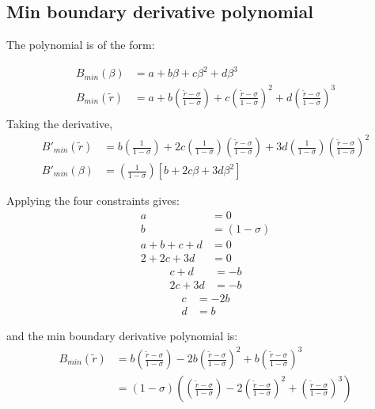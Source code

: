 \documentclass[a4paper]{article}
\begin{document}




\subsection{Min boundary derivative polynomial}



The polynomial is of the form: 

\begin{align*}
    B_{min} \left( \beta \right) &= 
    a + b \beta + c \beta^2 + d \beta^3                   \\
    B_{min} \left( \widetilde{r} \right) &= 
    a + b \left( \frac{\widetilde{r} - \sigma}{1 - \sigma} \right)+
    c\left( \frac{\widetilde{r} - \sigma}{1 - \sigma} \right)  ^2+
    d\left( \frac{\widetilde{r} - \sigma}{1 - \sigma} \right)^3                    \\
\end{align*}
Taking the derivative,
\begin{align*}
    B'_{min} \left( \widetilde{r} \right) &= 
    b \left( \frac{1}{1 - \sigma} \right)+
    2 c\left( \frac{1}{1 - \sigma} \right)\left( \frac{\widetilde{r} - \sigma}{1 - \sigma} \right)  +
    3 d\left( \frac{1}{1-\sigma} \right)\left( \frac{\widetilde{r} - \sigma}{1 - \sigma} \right)^2\\
    B'_{min} \left( \beta \right) &= 
    \left( \frac{1}{1 - \sigma} \right)
    \left[
    b +
    2 c \beta + 
    3 d \beta^2
    \right]
\end{align*}


Applying the four constraints gives:
\begin{align*}
    a &= 0\\
    b &= \left( 1 - \sigma \right) \\
    a + b + c + d &= 0\\
    2 + 2c + 3d &= 0
\end{align*}
\begin{align*}
    c + d &= -b  \\
    2c + 3d &= -b
\end{align*}
\begin{align*}
    c &= -2b \\
    d &= b
\end{align*}

and the min boundary derivative polynomial is: 
\begin{align*}
    B_{min}\left( \widetilde{r} \right) &= 
    b \left( \frac{\widetilde{r} - \sigma }{1 - \sigma}\right) -
    2b\left( \frac{\widetilde{r} - \sigma }{1 - \sigma}\right) ^2 +
    b \left( \frac{\widetilde{r} - \sigma }{1 - \sigma}\right)^3 \\
    &=  \left( 1 - \sigma \right)
    \left( \left( \frac{\widetilde{r} - \sigma }{1 - \sigma}\right)  - 
    2\left( \frac{\widetilde{r} - \sigma }{1 - \sigma}\right)^2 +
    \left( \frac{\widetilde{r} - \sigma }{1 - \sigma}\right)^3\right)
\end{align*} 
\end{document}
